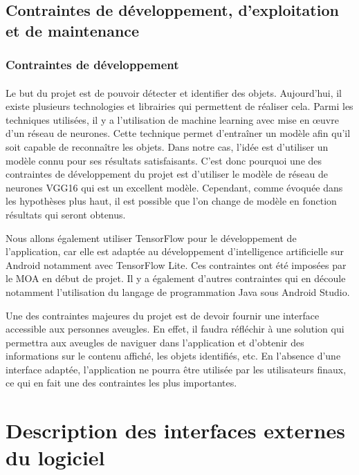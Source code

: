 \documentclass[CDS,UTF8,final]{EPURapport}
\begin{document}
\newpage

\subsection{Contraintes de développement, d'exploitation et de maintenance}
\subsubsection{Contraintes de développement}
\paragraph{}
Le but du projet est de pouvoir détecter et identifier des objets. Aujourd'hui, il existe plusieurs technologies et librairies qui permettent de réaliser cela. Parmi les techniques utilisées, il y a l'utilisation de machine learning avec mise en œuvre d'un réseau de neurones. Cette technique permet d'entraîner un modèle afin qu'il soit capable de reconnaître les objets. Dans notre cas, l'idée est d'utiliser un modèle connu pour ses résultats satisfaisants. C'est donc pourquoi une des contraintes de développement du projet est d'utiliser le modèle de réseau de neurones VGG16 qui est un excellent modèle. Cependant, comme évoquée dans les hypothèses plus haut, il est possible que l'on change de modèle en fonction résultats qui seront obtenus. \par

Nous allons également utiliser TensorFlow pour le développement de l'application, car elle est adaptée au développement d'intelligence artificielle sur Android notamment avec TensorFlow Lite. Ces contraintes ont été imposées par le MOA en début de projet. Il y a également d'autres contraintes qui en découle notamment l'utilisation du langage de programmation Java sous Android Studio. \par

Une des contraintes majeures du projet est de devoir fournir une interface accessible aux personnes aveugles. En effet, il faudra réfléchir à une solution qui permettra aux aveugles de naviguer dans l'application et d'obtenir des informations sur le contenu affiché, les objets identifiés, etc. En l'absence d'une interface adaptée, l'application ne pourra être utilisée par les utilisateurs finaux, ce qui en fait une des contraintes les plus importantes.

\section{Description des interfaces externes du logiciel}
\end{document}
